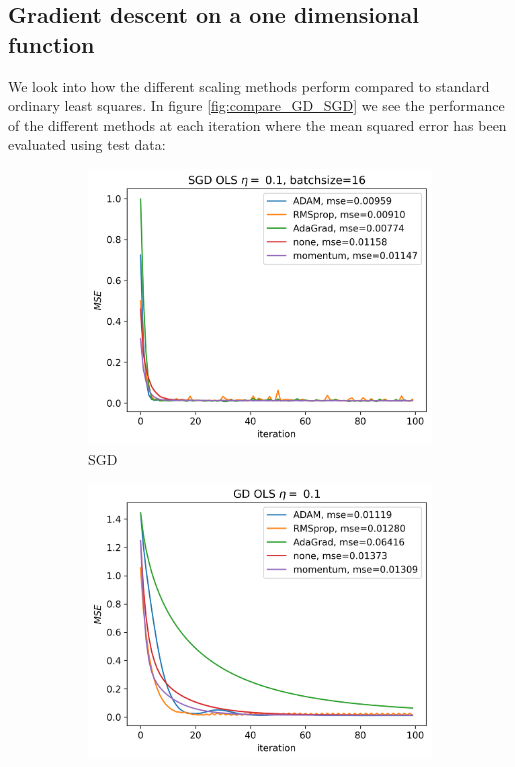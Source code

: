 \documentclass[11pt]{article}
\begin{document}
\subsection{Gradient descent on a one dimensional function}
We look into how the different scaling methods perform compared to standard ordinary least squares. In figure \ref{fig:compare_GD_SGD} we see the performance of the different methods at each iteration where the mean squared error has been evaluated using test data:
\begin{figure}[H]
    \begin{subfigure}{.5\textwidth}
        \centering
        \includegraphics[width=\textwidth]{../figures/SGD_methods_OLS_eta_0.1.png}
        \caption{SGD}
        \label{fig:}
    \end{subfigure}
    \begin{subfigure}{.5\textwidth}
        \centering
        \includegraphics[width=\textwidth]{../figures/GD_methods_OLS_eta_0.1.png}

\end{subfigure}
\end{figure}
\end{document}

